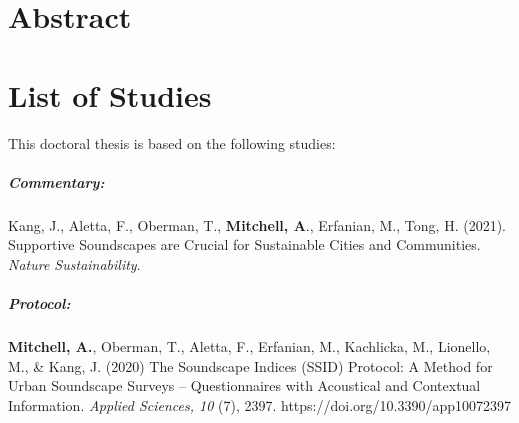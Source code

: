 \documentclass[twoside,fontsize=12pt,titlepage]{scrbook}
\begin{document}
\chapter*{Abstract}




\chapter*{List of Studies}

This doctoral thesis is based on the following studies:

\paragraph*{Commentary: }
Kang, J., Aletta, F., Oberman, T., \textbf{Mitchell, A}., Erfanian, M., Tong, H. (2021). Supportive Soundscapes are Crucial for Sustainable Cities and Communities. \emph{Nature Sustainability}.

\paragraph*{Protocol:  }
\textbf{Mitchell, A.}, Oberman, T., Aletta, F., Erfanian, M., Kachlicka, M., Lionello, M., \& Kang, J. (2020) The Soundscape Indices (SSID) Protocol: A Method for Urban Soundscape Surveys -- Questionnaires with Acoustical and Contextual Information. \emph{Applied Sciences, 10} (7), 2397. https://doi.org/10.3390/app10072397
\end{document}
